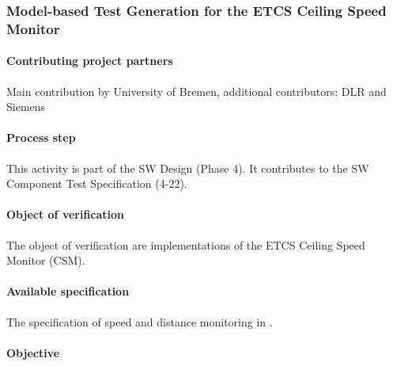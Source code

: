 
\subsubsection{Model-based Test Generation for the ETCS Ceiling Speed Monitor}
\label{sec:csmunibremen}

\paragraph{Contributing project partners}
Main contribution by University of Bremen, additional contributors: DLR and Siemens 

\paragraph{Process step}
This activity is part of the SW Design (Phase 4). It
contributes to the SW Component Test
Specification (4-22). 

\paragraph{Object of verification}
The object of verification are implementations of the ETCS
Ceiling Speed Monitor (CSM).  


\paragraph{Available specification}

The specification of speed and distance monitoring in \cite[Sec.~3.13]{subset-026:3.3.0}.

\paragraph{Objective}

